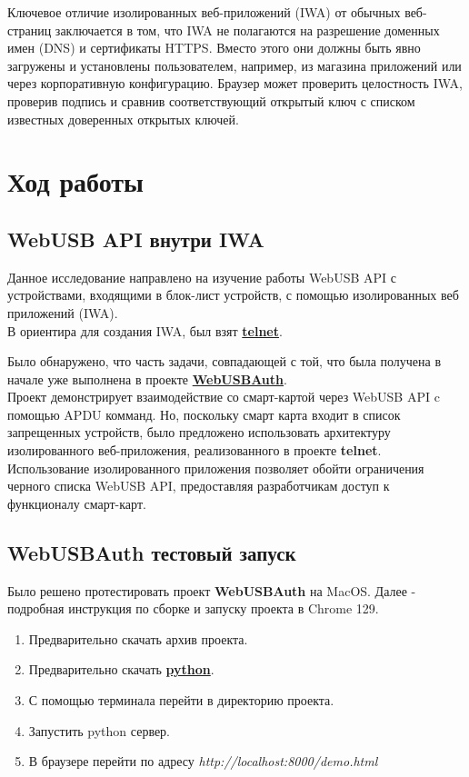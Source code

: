 \documentclass[12pt]{article}
\begin{document}
Ключевое отличие изолированных веб-приложений (IWA) от обычных веб-страниц заключается в том, что IWA не полагаются на разрешение доменных имен (DNS) и сертификаты HTTPS.  Вместо этого они должны быть явно загружены и установлены пользователем, например, из магазина приложений или через корпоративную конфигурацию. Браузер может проверить целостность IWA, проверив подпись и сравнив соответствующий открытый ключ с списком известных доверенных открытых ключей. 

\section{Ход работы}
\subsection{WebUSB API внутри IWA}
Данное исследование направлено на изучение работы WebUSB API с устройствами, входящими в блок-лист устройств, с помощью изолированных веб приложений (IWA). \\
В ориентира для создания IWA, был взят \href{https://github.com/GoogleChromeLabs/telnet-client}{\textbf{telnet}}. 

Было обнаружено, что часть задачи, совпадающей с той, что была получена в начале уже выполнена в проекте \href{https://github.com/jbirkholz/webusbAuth}{\textbf{WebUSBAuth}}. \\
Проект демонстрирует взаимодействие со смарт-картой через WebUSB API c помощью APDU комманд. Но, поскольку смарт карта входит в список запрещенных устройств, было предложено использовать архитектуру изолированного веб-приложения, реализованного в проекте \textbf{telnet}. 
Использование изолированного приложения позволяет обойти ограничения черного списка WebUSB API, предоставляя разработчикам доступ к функционалу смарт-карт. 

\subsection{WebUSBAuth тестовый запуск}
Было решено протестировать проект \textbf{WebUSBAuth} на MacOS. Далее - подробная инструкция по сборке и запуску проекта в Chrome 129. 
\begin{enumerate}
    \item Предварительно скачать архив проекта. 
    \item Предварительно скачать \href{https://www.python.org/downloads/macos/}{\textbf{python}}. 
    \item С помощью терминала перейти в директорию проекта. 
    \item Запустить python сервер. 
    \item В браузере перейти по адресу \emph{http://localhost:8000/demo.html}
\end{enumerate} 
\end{document}
